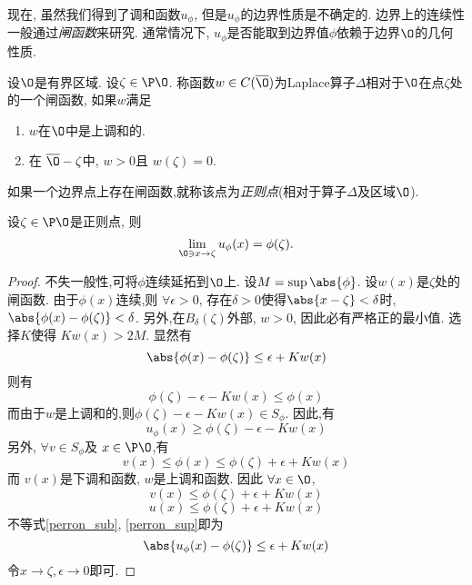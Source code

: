 现在, 虽然我们得到了调和函数$u_\phi$, 但是$u_\phi$的边界性质是不确定的. 边界上的连续性一般通过\textit{闸函数}来研究. 通常情况下, $u_\phi$是否能取到边界值$\phi$依赖于边界$\O$的几何性质.
\begin{definition}
    设$\O$是有界区域. 设$\zeta \in \P \O$. 称函数$w\in C(\overline{\O})$为Laplace算子$\Delta$相对于$\O$在点$\zeta$处的一个闸函数, 如果$w$满足 
    \begin{enumerate}
        \item $w$在$\O$中是上调和的.
        \item 在 $\overline{\O}-\zeta$中, $w >0$且 $w(\zeta)=0$.
    \end{enumerate}
\end{definition}
如果一个边界点上存在闸函数,就称该点为\textit{正则点}(相对于算子$\Delta$及区域$\O$).
\begin{lemma} \label{boundary}
    设$\zeta \in \P \O$是正则点, 则 
    \begin{equation}
        \lim_{\O \ni x \to \zeta} u_\phi(x)=\phi(\zeta).
    \end{equation}
\end{lemma}
\begin{proof}
    不失一般性,可将$\phi$连续延拓到$\O$上. 设$M=\sup \abs{\phi}$. 设$w(x)$是$\zeta$处的闸函数. 由于$\phi(x)$连续,则 $\forall \epsilon >0$, 存在$\delta>0$使得$\abs{x-\zeta} < \delta$时, $\abs{\phi(x)-\phi(\zeta)} < \delta$. 另外,在$B_\delta(\zeta)$外部, $w >0$, 因此必有严格正的最小值.  选择$K$使得 $Kw(x) > 2M$.  显然有
    \begin{equation}
        \abs{\phi(x)-\phi(\zeta)} \le \epsilon+Kw(x)
    \end{equation}
    则有
    \begin{equation}
        \phi(\zeta)-\epsilon-Kw(x) \le \phi(x)
    \end{equation}
    而由于$w$是上调和的,则$\phi(\zeta)-\epsilon-Kw(x) \in S_\phi$. 因此,有
    \begin{equation} \label{perron_sub}
        u_\phi(x) \ge \phi(\zeta)-\epsilon-Kw(x)
    \end{equation}
    另外, $\forall v \in S_\phi$及 $x \in \P \O$,有
    \begin{equation} 
        v(x)\le \phi(x) \le \phi(\zeta)+\epsilon+Kw(x)
    \end{equation}
    而 $v(x)$是下调和函数, $w$是上调和函数. 因此 $\forall x \in \O$,
    \begin{equation} \label{perron_sup_v}
        v(x)\le \phi(\zeta)+\epsilon+Kw(x)
    \end{equation}
    \begin{equation} \label{perron_sup}
        u(x)\le  \phi(\zeta)+\epsilon+Kw(x)
    \end{equation}
    不等式\eqref{perron_sub}, \eqref{perron_sup}即为
    \begin{equation}
        \abs{u_\phi(x)-\phi(\zeta)} \le \epsilon+Kw(x)
    \end{equation}
    令$x \to \zeta, \epsilon\to 0$即可.
\end{proof}
